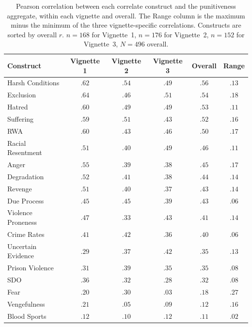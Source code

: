 \begin{table}[htbp]
  \centering
  \caption{Pearson correlation between each correlate construct and the punitiveness aggregate, within each vignette and overall. The Range column is the maximum minus the minimum of the three vignette-specific correlations. Constructs are sorted by overall $r$. $n = 168$ for Vignette~1, $n = 176$ for Vignette~2, $n = 152$ for Vignette~3, $N = 496$ overall.}
  \label{tab:vignette_stab}
  \footnotesize
  \begin{tabular}{lcccc c}
    \toprule
    Construct & Vignette 1 & Vignette 2 & Vignette 3 & Overall & Range \\
    \midrule
    Harsh Conditions   & $.62$ & $.54$ & $.49$ & $.56$ & $.13$ \\
    Exclusion          & $.64$ & $.46$ & $.51$ & $.54$ & $.18$ \\
    Hatred             & $.60$ & $.49$ & $.49$ & $.53$ & $.11$ \\
    Suffering          & $.59$ & $.51$ & $.43$ & $.52$ & $.16$ \\
    RWA                & $.60$ & $.43$ & $.46$ & $.50$ & $.17$ \\
    Racial Resentment  & $.51$ & $.40$ & $.49$ & $.46$ & $.11$ \\
    Anger              & $.55$ & $.39$ & $.38$ & $.45$ & $.17$ \\
    Degradation        & $.52$ & $.41$ & $.38$ & $.44$ & $.14$ \\
    Revenge            & $.51$ & $.40$ & $.37$ & $.43$ & $.14$ \\
    Due Process        & $.45$ & $.45$ & $.39$ & $.43$ & $.06$ \\
    Violence Proneness & $.47$ & $.33$ & $.43$ & $.41$ & $.14$ \\
    Crime Rates        & $.41$ & $.42$ & $.36$ & $.40$ & $.06$ \\
    Uncertain Evidence & $.29$ & $.37$ & $.42$ & $.35$ & $.13$ \\
    Prison Violence    & $.31$ & $.39$ & $.35$ & $.35$ & $.08$ \\
    SDO                & $.36$ & $.32$ & $.28$ & $.32$ & $.08$ \\
    Fear               & $.20$ & $.30$ & $.03$ & $.18$ & $.27$ \\
    Vengefulness       & $.21$ & $.05$ & $.09$ & $.12$ & $.16$ \\
    Blood Sports       & $.12$ & $.10$ & $.12$ & $.11$ & $.02$ \\
    \bottomrule
  \end{tabular}
\end{table}

